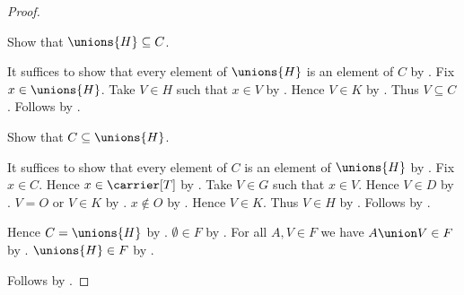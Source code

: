 \begin{proof}
\begin{subproof}
        Show that $\unions{H}\subseteq C$.
        \begin{subproof}
            It suffices to show that every element of $\unions{H}$ is an
                element of $C$ by .
            Fix $x\in\unions{H}$.
            Take $V\in H$ such that $x\in V$ by .
            Hence $V\in K$ by .
            Thus $V\subseteq C$.
            Follows by .
        \end{subproof}
        Show that $C\subseteq\unions{H}$.
        \begin{subproof}
            It suffices to show that every element of $C$ is an element
                of $\unions{H}$ by .
            Fix $x\in C$.
            Hence $x\in\carrier[T]$ by .
            Take $V\in G$ such that $x\in V$.
            Hence $V\in D$ by .
            $V=O$ or $V\in K$ by .
            $x\notin O$ by .
            Hence $V\in K$.
            Thus $V\in H$ by .
            Follows by .
        \end{subproof}
        Hence $C=\unions{H}$ by .
        $\emptyset\in F$ by .
        For all $A,V\in F$ we have $A\union V\in F$ by
            .
        $\unions{H}\in F$ by
            .
    \end{subproof}
    Follows by .
\end{proof}
